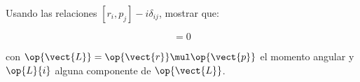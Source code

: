 \documentclass[../main.tex]{subfiles}
\begin{document}
\begin{problema}
	Usando las relaciones \([r_{i}, p_{j}] - i \delta_{ij}\), mostrar que:

	\begin{equation*}
		[\op{\vect{L}}{}{2}, \op{L}{i}] = 0
	\end{equation*}

	con \(\op{\vect{L}} = \op{\vect{r}} \mul \op{\vect{p}}\) el momento
	angular y \( \op{L}{i}\) alguna componente de \(\op{\vect{L}}\).
\end{problema}
\end{document}
